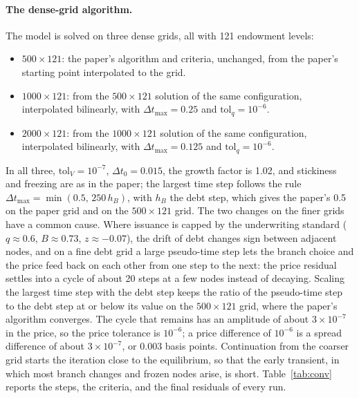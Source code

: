 \documentclass[11pt]{article}
\begin{document}
\paragraph{The dense-grid algorithm.} The model is solved on three dense grids, all with 121 endowment levels:
\begin{itemize}
\item $500\times121$: the paper's algorithm and criteria, unchanged, from the paper's starting point interpolated to the grid.
\item $1000\times121$: from the $500\times121$ solution of the same configuration, interpolated bilinearly, with $\Delta t_{\max}=0.25$ and $\text{tol}_q=10^{-6}$.
\item $2000\times121$: from the $1000\times121$ solution of the same configuration, interpolated bilinearly, with $\Delta t_{\max}=0.125$ and $\text{tol}_q=10^{-6}$.
\end{itemize}
In all three, $\text{tol}_V=10^{-7}$, $\Delta t_0=0.015$, the growth factor is 1.02, and stickiness and freezing are as in the paper; the largest time step follows the rule $\Delta t_{\max}=\min(0.5,\,250\,h_B)$, with $h_B$ the debt step, which gives the paper's 0.5 on the paper grid and on the $500\times121$ grid. The two changes on the finer grids have a common cause. Where issuance is capped by the underwriting standard ($q\approx0.6$, $B\approx0.73$, $z\approx-0.07$), the drift of debt changes sign between adjacent nodes, and on a fine debt grid a large pseudo-time step lets the branch choice and the price feed back on each other from one step to the next: the price residual settles into a cycle of about 20 steps at a few nodes instead of decaying. Scaling the largest time step with the debt step keeps the ratio of the pseudo-time step to the debt step at or below its value on the $500\times121$ grid, where the paper's algorithm converges. The cycle that remains has an amplitude of about $3\times10^{-7}$ in the price, so the price tolerance is $10^{-6}$; a price difference of $10^{-6}$ is a spread difference of about $3\times10^{-7}$, or $0.003$ basis points. Continuation from the coarser grid starts the iteration close to the equilibrium, so that the early transient, in which most branch changes and frozen nodes arise, is short. Table~\ref{tab:conv} reports the steps, the criteria, and the final residuals of every run.
\end{document}
